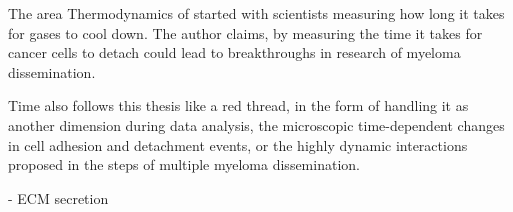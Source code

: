 

%
\label{sec:discussion_overall_conclusion}%

The area Thermodynamics of started with scientists measuring how long it takes
for gases to cool down. The author claims, by measuring the time it takes for
cancer cells to detach could lead to breakthroughs in research of myeloma
dissemination.

Time also follows this thesis like a red thread, in the form of handling it
as another dimension during data analysis, the microscopic time-dependent
changes in cell adhesion and detachment events, or the highly dynamic
interactions proposed in the steps of multiple myeloma dissemination. 

- ECM secretion